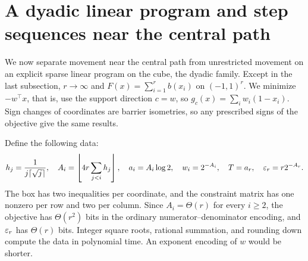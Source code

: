 \section{A dyadic linear program and step sequences near the central path}
\label{sec:discrete}
We now separate movement near the central path from unrestricted movement on
an explicit sparse linear program on the cube, the dyadic family. Except in the last
subsection, $r\to\infty$ and $F(x)=\sum_{i=1}^r b(x_i)$ on $(-1,1)^r$.
We minimize $-w^\top x$, that is, use the support direction $c=w$, so
$g_c(x)=\sum_iw_i(1-x_i)$.
Sign changes of coordinates are barrier isometries, so any prescribed
signs of the objective give the same results.

Define the following data:
\begin{equation}
 h_j=\frac1{j\lceil\sqrt j\rceil},\quad
 A_i=\left\lfloor4r\sum_{j<i}h_j\right\rfloor,\quad
 a_i=A_i\log2,\quad w_i=2^{-A_i},\quad
 T=a_r,\quad\varepsilon_r=r2^{-A_r}.
 \label{eq:dyadic-family}
\end{equation}
The box has two inequalities per coordinate, and the constraint matrix
has one nonzero per row and two per column. Since
$A_i=\Theta(r)$ for every $i\geq2$, the objective has $\Theta(r^2)$ bits
in the ordinary numerator--denominator encoding, and $\varepsilon_r$ has
$\Theta(r)$ bits. Integer square roots, rational summation, and rounding
down compute the data in polynomial time. An exponent encoding of $w$
would be shorter.

